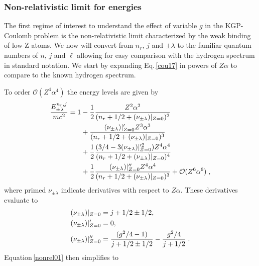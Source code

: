 \subsubsection{Non-relativistic limit for energies} \label{nonrel}
The first regime of interest to understand the effect of variable $g$ in the KGP-Coulomb problem is the non-relativistic limit characterized by the weak binding of low-Z atoms. We now will convert from $n_{r}$, $j$ and $\pm\lambda$ to the familiar quantum numbers of $n$, $j$ and $\ell$ allowing for easy comparison with the hydrogen spectrum in standard notation. We start by expanding Eq.\,\eqref{cou17} in powers of $Z\alpha$ to compare to the known hydrogen spectrum. 

To order $\mathcal{O}(Z^{4}\alpha^{4})$ the energy levels are given by
\begin{alignat}{1}
\label{nonrel01} \frac{E^{n_{r},j}_{\pm\lambda}}{mc^{2}}=1&-\frac{1}{2}\frac{Z^{2}\alpha^{2}}{(n_{r}+1/2+(\nu_{\pm\lambda})|_{Z=0})^{2}}\\ 
\notag &+\frac{(\nu_{\pm\lambda})|_{Z=0}'Z^{3}\alpha^{3}}{(n_{r}+1/2+(\nu_{\pm\lambda})|_{Z=0})^{3}}\\ 
\notag&+\frac{1}{2}\frac{(3/4-3(\nu_{\pm\lambda})|_{Z=0}'^{2})Z^{4}\alpha^{4}}{(n_{r}+1/2+(\nu_{\pm\lambda})|_{Z=0})^{4}}\\ 
\notag &+\frac{1}{2}\frac{(\nu_{\pm\lambda})|_{Z=0}^{\prime\prime} Z^{4}\alpha^{4}}{(n_{r}+1/2+(\nu_{\pm\lambda})|_{Z=0})^{3}}+\mathcal{O}(Z^{6}\alpha^{6})\;,\end{alignat}
where primed $\nu_{\pm\lambda}$ indicate derivatives with respect to $Z\alpha$. These derivatives evaluate to
\begin{alignat}{1}
\label{nonrel02} &(\nu_{\pm\lambda})|_{Z=0}=j+1/2\pm1/2,\\ \notag &(\nu_{\pm\lambda})|_{Z=0}'=0,\\ \notag &(\nu_{\pm\lambda})|_{Z=0}^{\prime\prime}=\frac{(g^{2}/4-1)}{j+1/2\pm1/2}-\frac{g^{2}/4}{j+1/2}\;.
\end{alignat}
Equation\,\eqref{nonrel01} then simplifies to
